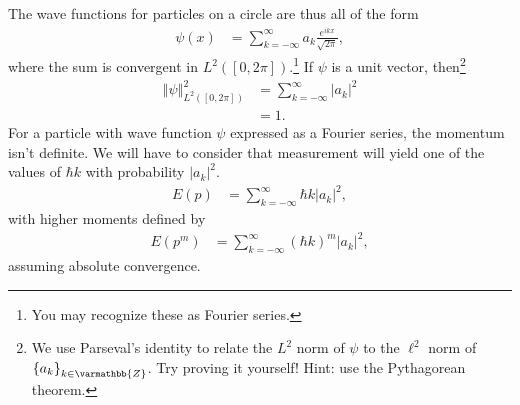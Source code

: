 \documentclass[12pt]{extarticle}
\newcommand{\Z}{\varmathbb{Z}}
\newcommand{\set}[1]{\left\{#1\right\}}
\newcommand{\norm}[1]{\left\Vert #1\right\Vert}
\theoremstyle{plain}
\theoremstyle{definition}
\theoremstyle{remark}
\begin{document}
  The wave functions for particles on a circle are thus all of the form
  \begin{align*}
    \psi(x) &= \sum_{k=-\infty}^{\infty} a_k\frac{e^{ikx}}{\sqrt{2\pi}},
  \end{align*}
  where the sum is convergent in $L^{2}([0,2\pi])$.\footnote{You may recognize these as Fourier series.} If $\psi$ is a unit vector, then\footnote{We use Parseval's identity to relate the $L^{2}$ norm of $\psi$ to the $\ell^{2}$ norm of $\set{a_k}_{k\in \Z}$. Try proving it yourself! Hint: use the Pythagorean theorem.}
  \begin{align*}
    \norm{\psi}_{L^{2}([0,2\pi])}^2 &= \sum_{k=-\infty}^{\infty}|a_k|^2\\
                                    &= 1.
  \end{align*}
  For a particle with wave function $\psi$ expressed as a Fourier series, the momentum isn't definite. We will have to consider that measurement will yield one of the values of $\hbar k$ with probability $|a_k|^2$.
  \begin{align*}
    E(p) &= \sum_{k=-\infty}^{\infty}\hbar k |a_k|^2,
  \end{align*}
  with higher moments defined by
  \begin{align*}
    E(p^m) &= \sum_{k=-\infty}^{\infty}(\hbar k)^{m}|a_k|^2,
  \end{align*}
  assuming absolute convergence.
\end{document}
